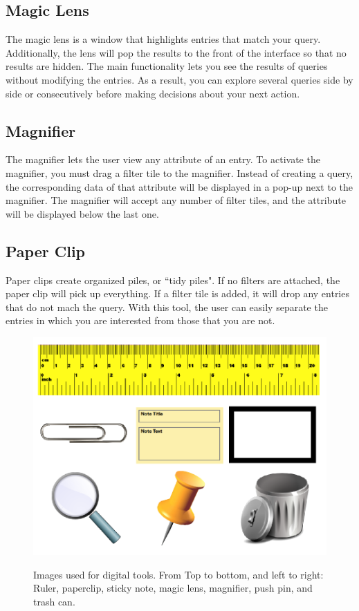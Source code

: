 \documentclass{article}
\begin{document}
\subsection*{Magic Lens}
The magic lens is a window that highlights entries that match your query.  Additionally, the lens will pop the results to the front of the interface so that no results are hidden.  The main functionality lets you see the results of queries without modifying the entries.  As a result, you can explore several queries side by side or consecutively before making decisions about your next action.    
\subsection*{Magnifier}
The magnifier lets the user view any attribute of an entry.  To activate the magnifier, you must drag a filter tile to the magnifier.  Instead of creating a query, the corresponding data of that attribute will be displayed in a pop-up next to the magnifier.  The magnifier will accept any number of filter tiles, and the attribute will be displayed below the last one.  
\subsection*{Paper Clip}
Paper clips create organized piles, or ``tidy piles".  If no filters are attached, the paper clip will pick up everything.  If a filter tile is added, it will drop any entries that do not mach the query.   With this tool, the user can easily separate the entries in which you are interested from those that you are not.

\begin{figure}[t]
\centering
\scalebox{.623}
{\includegraphics{ToolsFigure.png}}
\caption{Images used for digital tools.  From Top to bottom, and left to right: Ruler, paperclip, sticky note, magic lens, magnifier, push pin, and trash can.}  
\end{figure} 
\end{document}
